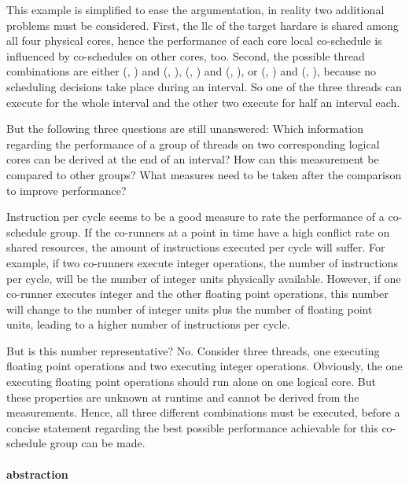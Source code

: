 This example is simplified to ease the argumentation, in reality two additional
problems must be considered.
First, the \gls{llc} of the target hardare is shared among all four physical cores,
hence the performance of each core local co-schedule is influenced by
co-schedules on other cores, too.
Second, the possible thread combinations are either (\alpha, \beta) and
(\gamma, \beta), (\alpha, \beta) and (\alpha, \gamma), or (\alpha, \gamma) and
(\beta, \gamma), because no scheduling decisions take place during an interval.
So one of the three threads can execute for the whole interval and the other
two execute for half an interval each.

But the following three questions are still unanswered:
Which information regarding the performance of a group of threads on two
corresponding logical cores can be derived at the end of an interval?
How can this measurement be compared to other groups?
What measures need to be taken after the comparison to improve performance?

Instruction per cycle seems to be a good measure to rate the performance of a
co-schedule group.
If the co-runners at a point in time have a high conflict
rate on shared resources, the amount of instructions executed per cycle will
suffer.
For example, if two co-runners execute integer operations, the number of
instructions per cycle, will be the number of integer units physically available.
However, if one co-runner executes integer and the other floating point
operations, this number will change to the number of integer units plus
the number of floating point units, leading to a higher number of instructions
per cycle.

But is this number representative? No. Consider three threads, one executing
floating point operations and two executing integer operations. Obviously, the
one executing floating point operations should run alone on one logical core.
But these properties are
unknown at runtime and cannot be derived from the measurements.
Hence, all three different combinations must be executed, before a concise
statement regarding the best possible performance achievable for this 
co-schedule group can be made.

\paragraph{abstraction}
